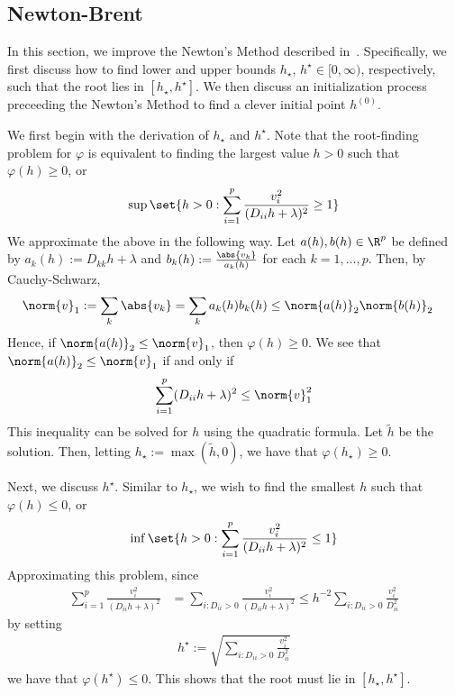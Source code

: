 \subsection{Newton-Brent}\label{ssec:newton-brent}

In this section, we improve the Newton's Method described in~.
Specifically, we first discuss how to find lower and upper bounds $h_\star$, $h^\star \in [0,\infty)$,
respectively, such that the root lies in $[h_\star, h^\star]$.
We then discuss an initialization process preceeding the Newton's Method
to find a clever initial point $h^{(0)}$.

We first begin with the derivation of $h_\star$ and $h^\star$.
Note that the root-finding problem for $\varphi$
is equivalent to finding the largest value $h > 0$ such that $\varphi(h) \geq 0$, or
\begin{align*}
    \sup\set{
        h > 0 :
        \sum\limits_{i=1}^p
        \frac{v_i^2}{(D_{ii} h + \lambda)^2}
        \geq
        1
    }
\end{align*}
We approximate the above in the following way.
Let $a(h), b(h) \in \R^p$ be defined by $a_k(h) := D_{kk} h + \lambda$
and $b_k(h) := \frac{\abs{v_k}}{a_k(h)}$ for each $k=1,\ldots, p$.
Then, by Cauchy-Schwarz,
\begin{align*}
    \norm{v}_1
    &:=
    \sum\limits_{k} \abs{v_k}
    =
    \sum\limits_{k} a_k(h) b_k(h)
    \leq
    \norm{a(h)}_{2} \norm{b(h)}_2
\end{align*}
Hence, if $\norm{a(h)}_2 \leq \norm{v}_1$,
then $\varphi(h) \geq 0$.
We see that $\norm{a(h)}_2 \leq \norm{v}_1$ if and only if
\begin{align*}
    \sum\limits_{i=1}^p
    (D_{ii} h + \lambda)^2
    \leq
    \norm{v}_1^2
\end{align*}
This inequality can be solved for $h$ using the quadratic formula.
Let $\tilde{h}$ be the solution.
Then, letting $h_\star := \max(\tilde{h}, 0)$,
we have that $\varphi(h_{\star}) \geq 0$.

Next, we discuss $h^\star$.
Similar to $h_\star$, we wish to find the smallest $h$ such that
$\varphi(h) \leq 0$, or
\begin{align*}
    \inf\set{
        h > 0
        :
        \sum\limits_{i=1}^p
        \frac{v_i^2}{(D_{ii} h + \lambda)^2}
        \leq
        1
    }
\end{align*}
Approximating this problem, since
\begin{align}
    \sum\limits_{i=1}^p
    \frac{v_i^2}{(D_{ii} h + \lambda)^2}
    &=
    \sum\limits_{i: D_{ii} > 0}
    \frac{v_i^2}{(D_{ii} h + \lambda)^2}
    \leq 
    h^{-2}
    \sum\limits_{i: D_{ii} > 0}
    \frac{v_i^2}{D_{ii}^2 }
    \label{eq:nmab:upper-approx}
\end{align}
by setting 
\begin{align*}
    h^\star
    := 
    \sqrt{
        \sum\limits_{i: D_{ii} > 0} \frac{v_i^2}{D_{ii}^2}
    }
\end{align*}
we have that $\varphi(h^\star) \leq 0$.
This shows that the root must lie in $[h_\star, h^\star]$.

